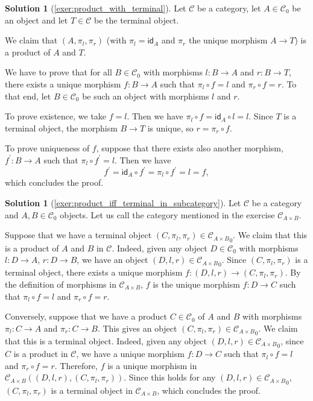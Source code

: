 \documentclass[a4paper,11pt, oneside,titlepage=false]{scrbook}
\theoremstyle{plain}
\theoremstyle{definition}
\newtheorem{solution}[thm]{Solution}
\newcommand{\cfont}[1]{\ensuremath{\mathsf{#1}}}
\newcommand{\Cat}[1]{\mathcal{#1}}
\newcommand{\CC}{\Cat{C}}
\newcommand{\Ob}[1]{{#1}_0}
\newcommand{\Id}[1][]{\cfont{id}_{#1}}
\newcommand{\projl}{\ensuremath{\pi_l}}
\newcommand{\projr}{\ensuremath{\pi_r}}
\begin{document}
\begin{solution}[\cref{exer:product_with_terminal}]\label{sol:product_with_terminal}
	Let $ \CC $ be a category, let $ A \in \Ob\CC $ be an object and let $ T \in \CC $ be the terminal object.

	We claim that $ (A, \projl, \projr) $ (with $ \projl = \Id[A] $ and $ \projr $ the unique morphism $ A \to T $) is a product of $ A $ and $ T $.

	We have to prove that for all $ B \in \Ob\CC $ with morphisms $ l: B \to A $ and $ r: B \to T $, there exists a unique morphism $ f: B \to A $ such that $ \projl \circ f = l $ and $ \projr \circ f = r $. To that end, let $ B \in \Ob\CC $ be such an object with morphisms $ l $ and $ r $.

	To prove existence, we take $ f = l $. Then we have $ \projl \circ f = \Id[A] \circ l = l $. Since $ T $ is a terminal object, the morphism $ B \to T $ is unique, so $ r = \projr \circ f $.

	To prove uniqueness of $ f $, suppose that there exists also another morphism, $ f^\prime: B \to A $ such that $ \projl \circ f^\prime = l $. Then we have
	\[ f^\prime = \Id[A] \circ f^\prime = \projl \circ f^\prime = l = f, \]
	which concludes the proof.
\end{solution}

\begin{solution}[\cref{exer:product_iff_terminal_in_subcategory}]\label{sol:product_iff_terminal_in_subcategory}
	Let $ \CC $ be a category and $ A, B \in \Ob \CC $ objects. Let us call the category mentioned in the exercise $ \CC_{A \times B} $.

	Suppose that we have a terminal object $ (C, \projl, \projr) \in \Ob{\CC_{A \times B}} $. We claim that this is a product of $ A $ and $ B $ in $ \CC $. Indeed, given any object $ D \in \Ob \CC $ with morphisms $ l: D \to A $, $ r: D \to B $, we have an object $ (D, l, r) \in \Ob{\CC_{A \times B}} $. Since $ (C, \projl, \projr) $ is a terminal object, there exists a unique morphism $ f: (D, l, r) \to (C, \projl, \projr) $. By the definition of morphisms in $ \CC_{A \times B} $, $ f $ is the unique morphism $ f: D \to C $ such that $ \projl \circ f = l $ and $ \projr \circ f = r $.

	Conversely, suppose that we have a product $ C \in \Ob \CC $ of $ A $ and $ B $ with morphisms $ \projl: C \to A $ and $ \projr: C \to B $. This gives an object $ (C, \projl, \projr) \in \Ob{\CC_{A \times B}} $. We claim that this is a terminal object. Indeed, given any object $ (D, l, r) \in \Ob{\CC_{A \times B}} $, since $ C $ is a product in $ \CC $, we have a unique morphism $ f: D \to C $ such that $ \projl \circ f = l $ and $ \projr \circ f = r $. Therefore, $ f $ is a unique morphism in $ \CC_{A \times B}((D, l, r), (C, \projl, \projr)) $. Since this holds for any $ (D, l, r) \in \Ob{\CC_{A \times B}} $, $ (C, \projl, \projr) $ is a terminal object in $ \CC_{A \times B} $, which concludes the proof.
\end{solution}
\end{document}
